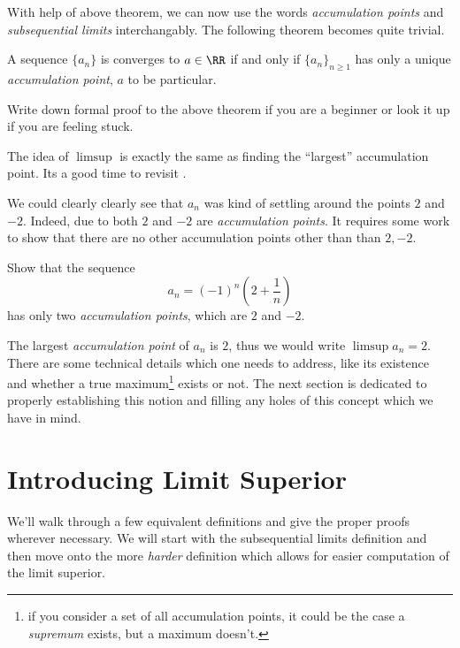 \documentclass[parskip=half, numbers=endperiod, 11pt]{scrartcl}
\begin{document}
With help of above theorem, we can now use the words
\emph{accumulation points} and \emph{subsequential limits}
interchangably. The following theorem becomes quite
trivial.

\begin{theorem}
	A sequence $\{a_n\}$ is converges to $a\in \RR$ if and
	only if $\{a_n\}_{n \ge 1}$ has only a unique
	\emph{accumulation point}, $a$ to be particular.
\end{theorem}

\begin{exercise}[Optional]
	Write down formal proof to the above theorem if you
	are a beginner or look it up if you are feeling stuck.
\end{exercise}

The idea of $\limsup$ is exactly the same as finding
the ``largest'' accumulation point. Its a good time to
revisit .

We could clearly clearly see that $a_n$ was kind of
settling around the points $2$ and $-2$. Indeed, due to
 both $2$ and $-2$ are
\emph{accumulation points}. It requires some work to show
that there are no other accumulation points other than
than $2,-2$.
\begin{exercise}
	Show that the sequence
	\[a_n = (-1)^{n}\left( 2 + \frac 1 n \right)\]
	has only two \emph{accumulation points}, which are
	$2$ and $-2$.
\end{exercise}

The largest \emph{accumulation point} of $a_n$ is $2$, thus
we would write $\limsup a_n = 2$. There are some technical
details which one needs to address, like its existence
and whether a true maximum\footnote{if you consider a
	set of all accumulation points, it could be the
	case a \emph{supremum} exists, but a maximum doesn't.}
exists or not. The next section is dedicated to properly
establishing this notion and filling any holes of this
concept which we have in mind.

\section{Introducing Limit Superior}

We'll walk through a few equivalent definitions and give
the proper proofs wherever necessary. We will start with
the subsequential limits definition and then move onto
the more \emph{harder} definition which allows for easier
computation of the limit superior.
\end{document}
